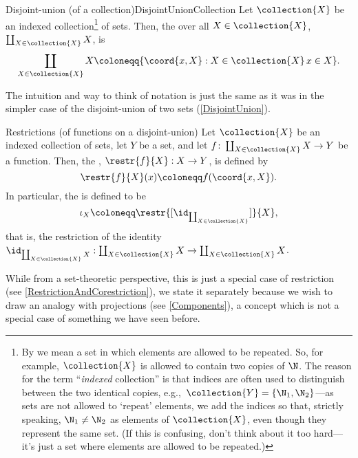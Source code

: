 \begin{dfn}{Disjoint-union (of a collection)}{DisjointUnionCollection}
Let $\collection{X}$ be an indexed collection\footnote{By  we mean a set in which elements are allowed to be repeated.  So, for example, $\collection{X}$ is allowed to contain two copies of $\N$.  The reason for the term ``\emph{indexed} collection'' is that indices are often used to distinguish between the two identical copies, e.g.,~$\collection{Y}=\{ \N _1,\N _2\}$---as sets are not allowed to `repeat' elements, we add the indices so that, strictly speaking, $\N _1\neq \N _2$ as elements of $\collection{X}$, even though they represent the same set.  (If this is confusing, don't think about it too hard---it's just a set where elements are allowed to be repeated.)} of sets.  Then, the  over all $X\in \collection{X}$, $\coprod _{X\in \collection{X}}X$, is
\begin{equation}
\coprod _{X\in \collection{X}}X\coloneqq \{ \coord{x,X}:X\in \collection{X}\, x\in X\} .
\end{equation}
\begin{rmk}
The intuition and way to think of notation is just the same as it was in the simpler case of the disjoint-union of two sets (\cref{DisjointUnion}).
\end{rmk}
\end{dfn}
\begin{dfn}{Restrictions (of functions on a dis\-joint-union)}{}
Let $\collection{X}$ be an indexed collection of sets, let $Y$ be a set, and let $f\colon \coprod _{X\in \collection{X}}X\rightarrow Y$ be a function.  Then, the , $\restr{f}{X}:X\rightarrow Y$, is defined by
\begin{equation}
\restr{f}{X}(x)\coloneqq f(\coord{x,X}).
\end{equation}
In particular, the  is defined to be
\begin{equation}
\iota _X\coloneqq \restr{[\id _{\coprod _{X\in \collection{X}}}]}{X},
\end{equation}
that is, the restriction of the identity $\id _{\coprod _{X\in \collection{X}}X}:\coprod _{X\in \collection{X}}X\rightarrow \coprod _{X\in \collection{X}}X$.
\begin{rmk}
While from a set-theoretic perspective, this is just a special case of restriction (see \cref{RestrictionAndCorestriction}), we state it separately because we wish to draw an analogy with projections (see \cref{Components}), a concept which is not a special case of something we have seen before. 
\end{rmk}
\end{dfn}

